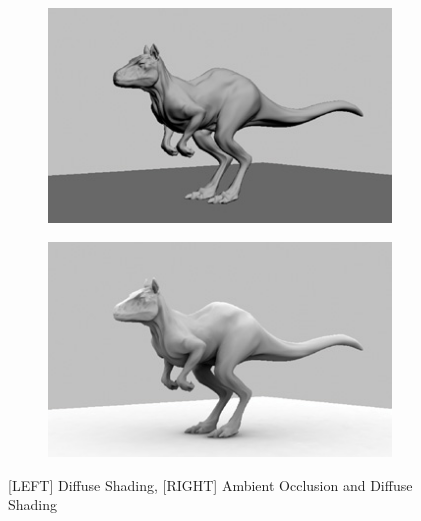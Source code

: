 \documentclass[10pt,twocolumn,letterpaper]{article}
\begin{document}
\begin{figure}
\centering
\begin{subfigure}{.5\columnwidth}
  \centering
  \includegraphics[width=0.8\linewidth]{./assets/AO_DiffuseOnly.jpg}
  \label{fig:AO1_diffuse}
\end{subfigure}%
\begin{subfigure}{.5\columnwidth}
  \centering
  \includegraphics[width=0.8\linewidth]{./assets/AO_FullAO.jpg}
  \label{fig:AO1_fullao}
\end{subfigure}
\caption{[LEFT] Diffuse Shading, [RIGHT] Ambient Occlusion and Diffuse Shading }
\label{fig:AO1}
\end{figure}
\end{document}
